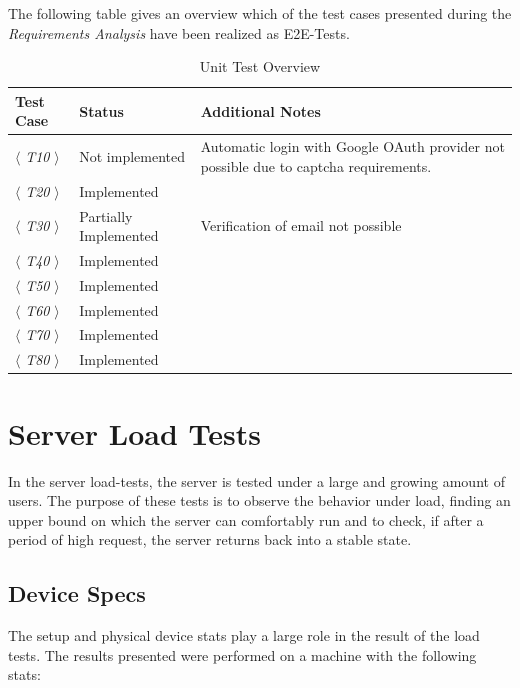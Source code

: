 The following table gives an overview which of the test cases presented during the \textit{Requirements Analysis} have been realized as E2E-Tests.

\begin{table}[h]
    \center

    \begin{tabular}{|p{3cm}|p{4cm}|p{6cm}|}
        \hline
        \textbf{Test Case} & \textbf{Status} & \textbf{Additional Notes} \\
        \hline
        $\langle$ \textit{T10} $\rangle$ & Not implemented & Automatic login with Google OAuth provider not possible due to captcha requirements. \\
        \hline
        $\langle$ \textit{T20} $\rangle$ & Implemented & \\
        \hline
        $\langle$ \textit{T30} $\rangle$ & Partially Implemented & Verification of email not possible \\
        \hline
        $\langle$ \textit{T40} $\rangle$ & Implemented & \\
        \hline
        $\langle$ \textit{T50} $\rangle$ & Implemented & \\
        \hline
        $\langle$ \textit{T60} $\rangle$ & Implemented & \\
        \hline
        $\langle$ \textit{T70} $\rangle$ & Implemented & \\
        \hline
        $\langle$ \textit{T80} $\rangle$ & Implemented & \\
        \hline
    \end{tabular}

    \caption{Unit Test Overview}
    \label{tab:e2e-test-overview}
\end{table}

\section{Server Load Tests}
In the server load-tests, the server is tested under a large and growing amount of users.
The purpose of these tests is to observe the behavior under load, finding an upper bound on which the server can comfortably run and to check, if after a period of high request, the server returns back into a stable state.

\subsection{Device Specs}
The setup and physical device stats play a large role in the result of the load tests.
The results presented were performed on a machine with the following stats:

